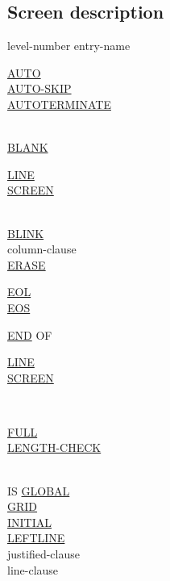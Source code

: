 \documentclass[a4paper,oneside,svgnames]{scrbook}
\makeatletter
\newcommand{\key}[1]{\underline{#1}}
\newcommand{\miscext}[1]{%
  \colorbox{blue!50}{#1}}
\newcommand{\pending}[1]{%
  \textcolor{gray!75}{#1}}
\newenvironment{0-1}{$\left[ \begin{tabular}{@{}l@{}}}{\end{tabular} \right]$}
\newenvironment{1=}{$\left\{ \begin{tabular}{@{}l@{}}}{\end{tabular} \right\}$}
\makeatother
\begin{document}
\subsection{Screen description}
level-number entry-name
\begin{0-1}
  \begin{1=}
    \key{AUTO} \\
    \miscext{\key{AUTO-SKIP}} \\
    \miscext{\key{AUTOTERMINATE}} \\
  \end{1=} \\


  \key{BLANK}
  \begin{1=}
    \key{LINE} \\
    \key{SCREEN}
  \end{1=} \\

  \key{BLINK} \\

  column-clause \\

  \key{ERASE}
  \begin{1=}
    \key{EOL} \\
    \key{EOS} \\

    \begin{0-1}
      \key{END} OF
    \end{0-1}
    \begin{1=}
      \key{LINE} \\
      \key{SCREEN}
    \end{1=}
  \end{1=} \\

  \begin{1=}
    \key{FULL} \\
    \miscext{\key{LENGTH-CHECK}} \\
  \end{1=} \\

  IS \key{GLOBAL} \\
  \miscext{\pending{\key{GRID}}} \\

  \miscext{\key{INITIAL}} \\
  \miscext{\pending{\key{LEFTLINE}}} \\
  justified-clause \\
  line-clause \\


\end{0-1}
\end{document}
